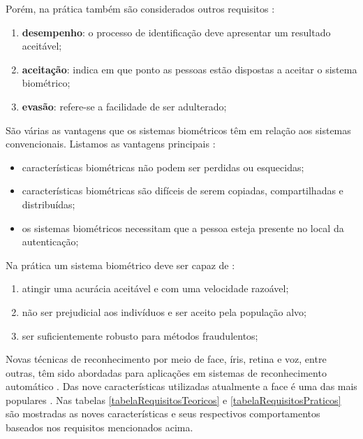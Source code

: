 Porém, na prática também são considerados outros requisitos \cite{milene}:

	\begin{enumerate}
		\item \textbf{desempenho}: o processo de identificação deve apresentar um resultado aceitável;
		\item \textbf{aceitação}: indica em que ponto as pessoas estão dispostas a aceitar o sistema biométrico;
		\item \textbf{evasão}: refere-se a facilidade de ser adulterado;
	\end{enumerate}

São várias as vantagens que os sistemas biométricos têm em relação aos sistemas convencionais. Listamos as vantagens principais \cite{drovetto}:
	
	\begin{itemize}
		\item características biométricas não podem ser perdidas ou esquecidas;
		\item características biométricas são difíceis de serem copiadas, compartilhadas e distribuídas;
		\item os sistemas biométricos necessitam que a pessoa esteja presente no local da autenticação;
	\end{itemize}

Na prática um sistema biométrico deve ser capaz de \cite{hong}:
		
	\begin{enumerate}
		\item atingir uma acurácia aceitável e com uma velocidade razoável;
		\item não ser prejudicial aos indivíduos e ser aceito pela população alvo;
		\item ser suficientemente robusto para métodos fraudulentos;
	\end{enumerate}

Novas técnicas de reconhecimento por meio de face, íris, retina e voz, entre outras, têm sido abordadas para aplicações em sistemas de reconhecimento automático \cite{bolle,saocarlos}. Das nove características utilizadas atualmente a face é uma das mais populares \cite{milene}. Nas tabelas \ref{tabelaRequisitosTeoricos} e \ref{tabelaRequisitosPraticos} são mostradas as noves características e seus respectivos comportamentos baseados nos requisitos mencionados acima.
		
